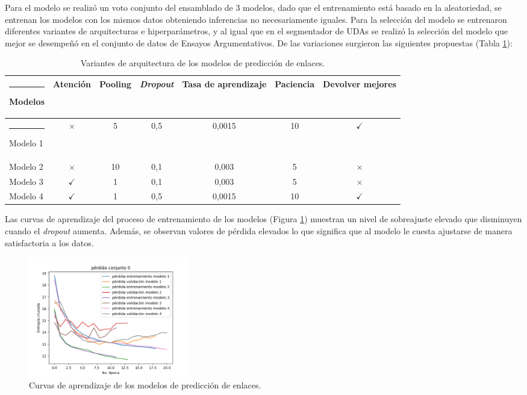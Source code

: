 \documentclass[a4paper,11pt,twocolumn,twoside]{article}
\begin{document}
Para el modelo se realizó un voto conjunto del ensamblado de 3 modelos, dado que el entrenamiento 
está basado en la aleatoriedad, se entrenan los modelos con los mismos datos obteniendo inferencias no
necesariamente iguales.
Para la selección del modelo se entrenaron diferentes variantes de arquitecturas e hiperparámetros, y 
al igual que en el segmentador de UDAs se realizó la selección del modelo que mejor se desempeñó en 
el conjunto de datos de Ensayos Argumentativos. De las variaciones surgieron las siguientes propuestas
(Tabla \ref{table:link_predictor_architecture_table}):

\begin{table}[h]
	\begin{center}
		\begin{tabular}{|l|c|c|c|c|c|c|} 
			\hline\rule{-2pt}{15pt}
			Modelos  & Atención     & Pooling & \textit{Dropout} & Tasa de aprendizaje & Paciencia & Devolver mejores \\ 
			\hline\rule{-4pt}{10pt}
			Modelo 1 & $\times$     & 5       & 0,5            & 0,0015              & 10        & $\checkmark$     \\
			Modelo 2 & $\times$     & 10      & 0,1            & 0,003               & 5         & $\times$         \\
			Modelo 3 & $\checkmark$ & 1       & 0,1            & 0,003               & 5         & $\times$         \\
			Modelo 4 & $\checkmark$ & 1       & 0,5            & 0,0015              & 10        & $\checkmark$     \\
			\hline
		\end{tabular}
	\end{center}
	\caption{\label{table:link_predictor_architecture_table}Variantes de arquitectura de los modelos de predicción de enlaces.}
\end{table}

Las curvas de aprendizaje del proceso de entrenamiento de los modelos (Figura \ref{fig:link_prediction_model_loss}) 
muestran un nivel de sobreajuste 
elevado que disminuyen cuando el \textit{dropout} aumenta. Además, se observan valores de pérdida elevados lo que significa 
que al modelo le cuesta ajustarse de manera satisfactoria a los datos.

\begin{figure}[h]
	\centering
	\includegraphics[width=7cm,clip]{Graphics/persuassive_essays_all_linked_link_prediction_loss_model_1.png}
	\caption{Curvas de aprendizaje de los modelos de predicción de enlaces.}
	\label{fig:link_prediction_model_loss}
\end{figure}
\end{document}

